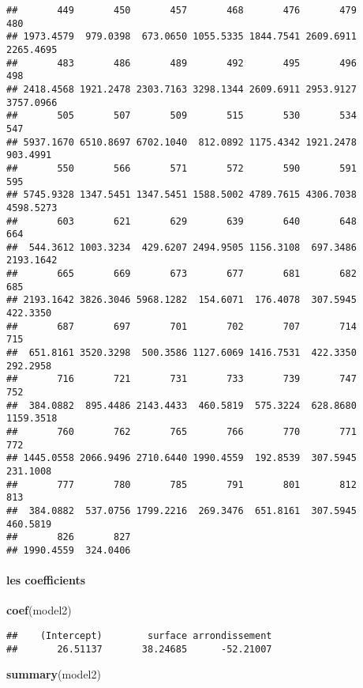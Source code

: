 \documentclass[]{article}
\newenvironment{Shaded}{\begin{snugshade}}{\end{snugshade}}
\newcommand{\KeywordTok}[1]{\textcolor[rgb]{0.13,0.29,0.53}{\textbf{#1}}}
\newcommand{\NormalTok}[1]{#1}
\let\oldparagraph\paragraph
\renewcommand{\paragraph}[1]{\oldparagraph{#1}\mbox{}}
\begin{document}
\begin{verbatim}
##       449       450       457       468       476       479       480 
## 1973.4579  979.0398  673.0650 1055.5335 1844.7541 2609.6911 2265.4695 
##       483       486       489       492       495       496       498 
## 2418.4568 1921.2478 2303.7163 3298.1344 2609.6911 2953.9127 3757.0966 
##       505       507       509       515       530       534       547 
## 5937.1670 6510.8697 6702.1040  812.0892 1175.4342 1921.2478  903.4991 
##       550       566       571       572       590       591       595 
## 5745.9328 1347.5451 1347.5451 1588.5002 4789.7615 4306.7038 4598.5273 
##       603       621       629       639       640       648       664 
##  544.3612 1003.3234  429.6207 2494.9505 1156.3108  697.3486 2193.1642 
##       665       669       673       677       681       682       685 
## 2193.1642 3826.3046 5968.1282  154.6071  176.4078  307.5945  422.3350 
##       687       697       701       702       707       714       715 
##  651.8161 3520.3298  500.3586 1127.6069 1416.7531  422.3350  292.2958 
##       716       721       731       733       739       747       752 
##  384.0882  895.4486 2143.4433  460.5819  575.3224  628.8680 1159.3518 
##       760       762       765       766       770       771       772 
## 1445.0558 2066.9496 2710.6440 1990.4559  192.8539  307.5945  231.1008 
##       777       780       785       791       801       812       813 
##  384.0882  537.0756 1799.2216  269.3476  651.8161  307.5945  460.5819 
##       826       827 
## 1990.4559  324.0406
\end{verbatim}

\paragraph{les coefficients}\label{les-coefficients}

\begin{Shaded}
\begin{Highlighting}[]
\KeywordTok{coef}\NormalTok{(model2)}
\end{Highlighting}
\end{Shaded}

\begin{verbatim}
##    (Intercept)        surface arrondissement 
##       26.51137       38.24685      -52.21007
\end{verbatim}

\begin{Shaded}
\begin{Highlighting}[]
\KeywordTok{summary}\NormalTok{(model2)}
\end{Highlighting}
\end{Shaded}
\end{document}
